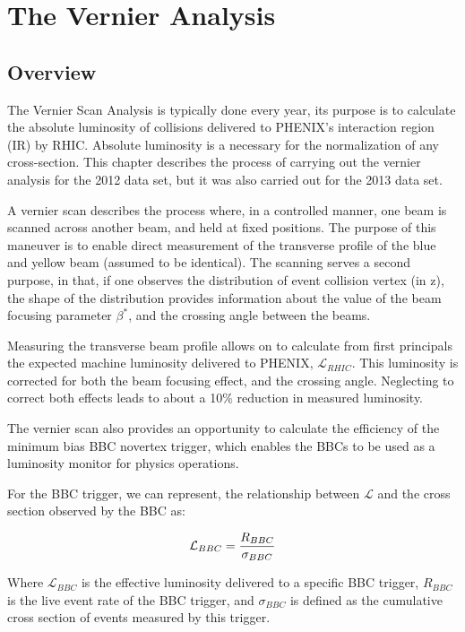 \chapter{The Vernier Analysis}
\label{ch:vernier_analysis}
\section{Overview}

The Vernier Scan Analysis is typically done every year, its purpose is to
calculate the absolute luminosity of collisions delivered to PHENIX's
interaction region (IR) by RHIC.  Absolute luminosity is a necessary for the
normalization of any cross-section. This chapter describes the process of
carrying out the vernier analysis for the 2012 data set, but it was also
carried out for the 2013 data set.

A vernier scan describes the process where, in a controlled manner, one beam is
scanned across another beam, and held at fixed positions. The purpose of this
maneuver is to enable direct measurement of the transverse profile of the blue
and yellow beam (assumed to be identical). The scanning serves a second purpose,
in that, if one observes the distribution of event collision vertex (in z), the
shape of the distribution provides information about the value of the beam
focusing parameter $\beta^*$, and the crossing angle between the beams.

Measuring the transverse beam profile allows on to calculate from first
principals the expected machine luminosity delivered to PHENIX,
$\mathcal{L}_{RHIC}$. This luminosity is corrected for both the beam focusing
effect, and the crossing angle. Neglecting to correct both effects leads to
about a 10\% reduction in measured luminosity. 

The vernier scan also provides an opportunity to calculate the efficiency of the
minimum bias BBC novertex trigger, which enables the BBCs to be used as a
luminosity monitor for physics operations. 

For the BBC trigger, we can represent, the relationship between $\mathcal{L}$
and the cross section observed by the BBC as:

\begin{equation} 
\label{eq:lumi_xsec_simple} 
\mathcal{L}_{BBC} = {R_{BBC}\over\sigma_{BBC}} 
\end{equation}

{\noindent}Where $\mathcal{L}_{BBC}$ is the effective luminosity delivered to a
specific BBC trigger, $R_{BBC}$ is the live event rate of the BBC trigger, and
$\sigma_{BBC}$ is defined as the cumulative cross section of events measured by
this trigger.

